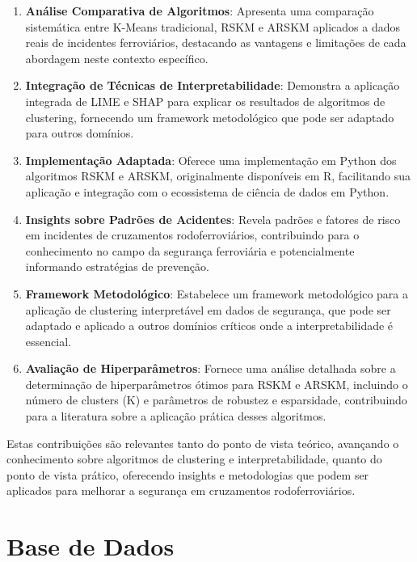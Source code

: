\documentclass[conference]{IEEEtran}
\begin{document}
\begin{enumerate}
    \item \textbf{Análise Comparativa de Algoritmos}: Apresenta uma comparação sistemática entre K-Means tradicional, RSKM e ARSKM aplicados a dados reais de incidentes ferroviários, destacando as vantagens e limitações de cada abordagem neste contexto específico.
    
    \item \textbf{Integração de Técnicas de Interpretabilidade}: Demonstra a aplicação integrada de LIME e SHAP para explicar os resultados de algoritmos de clustering, fornecendo um framework metodológico que pode ser adaptado para outros domínios.
    
    \item \textbf{Implementação Adaptada}: Oferece uma implementação em Python dos algoritmos RSKM e ARSKM, originalmente disponíveis em R, facilitando sua aplicação e integração com o ecossistema de ciência de dados em Python.
    
    \item \textbf{Insights sobre Padrões de Acidentes}: Revela padrões e fatores de risco em incidentes de cruzamentos rodoferroviários, contribuindo para o conhecimento no campo da segurança ferroviária e potencialmente informando estratégias de prevenção.
    
    \item \textbf{Framework Metodológico}: Estabelece um framework metodológico para a aplicação de clustering interpretável em dados de segurança, que pode ser adaptado e aplicado a outros domínios críticos onde a interpretabilidade é essencial.
    
    \item \textbf{Avaliação de Hiperparâmetros}: Fornece uma análise detalhada sobre a determinação de hiperparâmetros ótimos para RSKM e ARSKM, incluindo o número de clusters (K) e parâmetros de robustez e esparsidade, contribuindo para a literatura sobre a aplicação prática desses algoritmos.
\end{enumerate}

Estas contribuições são relevantes tanto do ponto de vista teórico, avançando o conhecimento sobre algoritmos de clustering e interpretabilidade, quanto do ponto de vista prático, oferecendo insights e metodologias que podem ser aplicados para melhorar a segurança em cruzamentos rodoferroviários.

\section{Base de Dados}
\end{document}

